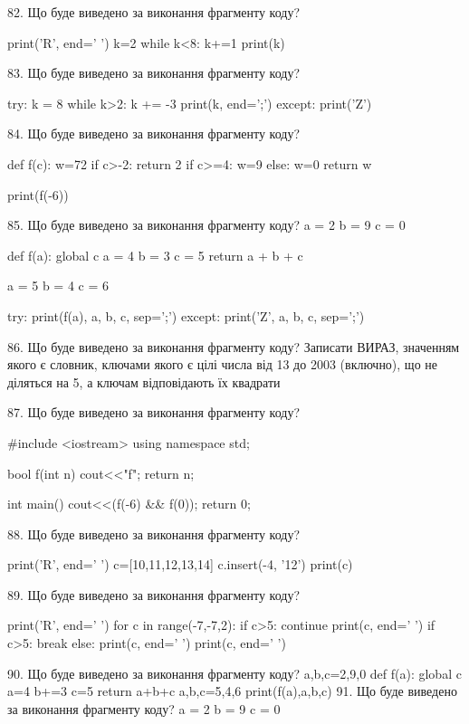 \documentclass[11pt]{article}
\begin{document}
82. Що буде виведено за виконання фрагменту коду?

print('R', end=' ')
k=2
while k<8:
    k+=1
print(k)


83. Що буде виведено за виконання фрагменту коду?

try:
    k = 8
    while k>2:
        k += -3
    print(k, end=';')
except:
    print('Z')


84. Що буде виведено за виконання фрагменту коду?

def f(c):
    w=72
    if c>-2: 
        return 2
    if c>=4:
         w=9
    else:
         w=0
    return w

print(f(-6))

85. Що буде виведено за виконання фрагменту коду?
a = 2
b = 9
c = 0

def f(a):
global c    a = 4
    b = 3
    c = 5
    return a + b + c

a = 5
b = 4
c = 6

try:
    print(f(a), a, b, c, sep=';')
except:
    print('Z', a, b, c, sep=';')

86. Що буде виведено за виконання фрагменту коду?
Записати ВИРАЗ, значенням якого є словник, ключами якого є цілі числа від 13 до 2003 (включно), що не діляться на 5, а ключам відповідають їх квадрати 

87. Що буде виведено за виконання фрагменту коду?

#include <iostream>
using namespace std;

bool f(int n){
    cout<<"f";
    return n;
}

int main(){
    cout<<(f(-6) && f(0));
    return 0;
}

88. Що буде виведено за виконання фрагменту коду?

print('R', end=' ')
c=[10,11,12,13,14]
c.insert(-4, '12')
print(c)


89. Що буде виведено за виконання фрагменту коду?

print('R', end=' ')
for c in range(-7,-7,2):
    if c>5:
        continue
        print(c, end=' ')
    if c>5:
        break
    else:
        print(c, end=' ')
    print(c, end=' ')

90. Що буде виведено за виконання фрагменту коду?
a,b,c=2,9,0
   def f(a):
     global c     a=4
     b+=3
     c=5
     return a+b+c
   a,b,c=5,4,6
   print(f(a),a,b,c)
91. Що буде виведено за виконання фрагменту коду?
a = 2
b = 9
c = 0
\end{document}
